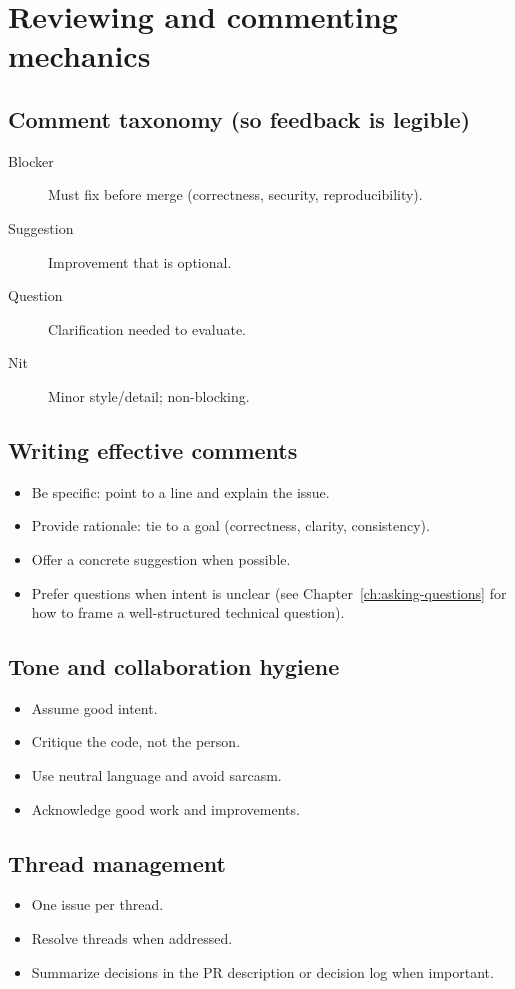 \section{Reviewing and commenting mechanics}
\subsection{Comment taxonomy (so feedback is legible)}
\begin{description}
\item[Blocker] Must fix before merge (correctness, security, reproducibility).
\item[Suggestion] Improvement that is optional.
\item[Question] Clarification needed to evaluate.
\item[Nit] Minor style/detail; non-blocking.
\end{description}

\subsection{Writing effective comments}
\begin{itemize}
\item Be specific: point to a line and explain the issue.
\item Provide rationale: tie to a goal (correctness, clarity, consistency).
\item Offer a concrete suggestion when possible.
\item Prefer questions when intent is unclear (see Chapter~\ref{ch:asking-questions} for how to frame a well-structured technical question).
\end{itemize}

\subsection{Tone and collaboration hygiene}
\begin{itemize}
\item Assume good intent.
\item Critique the code, not the person.
\item Use neutral language and avoid sarcasm.
\item Acknowledge good work and improvements.
\end{itemize}

\subsection{Thread management}
\begin{itemize}
\item One issue per thread.
\item Resolve threads when addressed.
\item Summarize decisions in the PR description or decision log when important.
\end{itemize}

